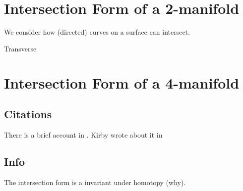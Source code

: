 \section{Intersection Form of a 2-manifold}
We consider how (directed) curves on a surface can intersect.


\begin{boxDefinition}{Transverse}
\end{boxDefinition}



\section{Intersection Form of a 4-manifold}

\subsection{Citations}
There is a brief account in \cite{gompf_stipsicz_1999}.
Kirby wrote about it in \cite{kirby_1991}
\subsection{Info}
The intersection form is a invariant under homotopy (why).
